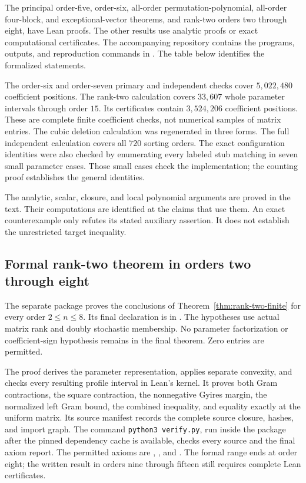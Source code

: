 \documentclass[11pt,a4paper]{article}
\theoremstyle{definition}
\theoremstyle{remark}
\begin{document}
The principal order-five, order-six, all-order permutation-polynomial, all-order four-block, and exceptional-vector theorems, and rank-two orders two through eight, have Lean proofs. The other results use analytic proofs or exact computational certificates.
The accompanying repository contains the programs, outputs, and reproduction commands in
.
The table below identifies the formalized statements.

The order-six and order-seven primary and independent checks cover $5{,}022{,}480$ coefficient positions.
The rank-two calculation covers $33{,}607$ whole parameter intervals through order $15$.
Its certificates contain $3{,}524{,}206$ coefficient positions.
These are complete finite coefficient checks, not numerical samples of matrix entries.
The cubic deletion calculation was regenerated in three forms.
The full independent calculation covers all $720$ sorting orders.
The exact configuration identities were also checked by enumerating every labeled stub matching in seven small parameter cases.
Those small cases check the implementation; the counting proof establishes the general identities.

The analytic, scalar, closure, and local polynomial arguments are proved in the text.
Their computations are identified at the claims that use them.
An exact counterexample only refutes its stated auxiliary assertion.
It does not establish the unrestricted target inequality.

\subsection{Formal rank-two theorem in orders two through eight}

The separate package  proves the conclusions of Theorem~\ref{thm:rank-two-finite} for every order $2\le n\le8$.
Its final declaration is  in .
The hypotheses use actual matrix rank and doubly stochastic membership.
No parameter factorization or coefficient-sign hypothesis remains in the final theorem.
Zero entries are permitted.

The proof derives the parameter representation, applies separate convexity, and checks every resulting profile interval in Lean's kernel.
It proves both Gram contractions, the square contraction, the nonnegative Gyires margin, the normalized left Gram bound, the combined inequality, and equality exactly at the uniform matrix.
Its source manifest records the complete source closure, hashes, and import graph.
The command \texttt{python3 verify.py}, run inside the package after the pinned dependency cache is available, checks every source and the final axiom report.
The permitted axioms are , , and .
The formal range ends at order eight; the written result in orders nine through fifteen still requires complete Lean certificates.
\end{document}
